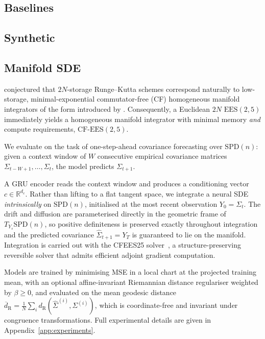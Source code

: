 \documentclass{article}
\theoremstyle{definition}
\theoremstyle{remark}
\begin{document}
\subsection{Baselines}

\subsection{Synthetic}

\subsection{Manifold SDE}
\label{subsec:experiment_manifold_sde}
\citet{bazavov_commutator-free_2020} conjectured that $2N$-storage Runge--Kutta schemes correspond naturally to low-storage, minimal-exponential commutator-free (CF) homogeneous manifold integrators of the form introduced by \citet{celledoni_commutator-free_2003}. Consequently, a Euclidean $2N$ $\mathrm{EES}(2,5)$ immediately yields a homogeneous manifold integrator with minimal memory \textit{and} compute requirements, $\mathrm{CF\text{-}EES}(2,5)$.


We evaluate on the task of one-step-ahead covariance forecasting over
$\mathrm{SPD}(n)$: given a context window of $W$ consecutive empirical covariance
matrices $\Sigma_{t-W+1}, \ldots, \Sigma_t$, the model predicts $\Sigma_{t+1}$.

A GRU encoder reads the context window and produces a conditioning vector
$c \in \mathbb{R}^{d_c}$.  Rather than lifting to a flat tangent space, we integrate
a neural SDE \emph{intrinsically} on $\mathrm{SPD}(n)$, initialised at the most recent
observation $Y_0 = \Sigma_t$.  The drift and diffusion are parameterised directly in
the geometric frame of $T_{Y_s}\mathrm{SPD}(n)$, so positive definiteness is preserved
exactly throughout integration and the predicted covariance $\hat\Sigma_{t+1} = Y_T$
is guaranteed to lie on the manifold.  Integration is carried out with the
CFEES25 solver~\cite{cfees25}, a structure-preserving reversible solver that admits
efficient adjoint gradient computation.

Models are trained by minimising MSE in a local chart at the projected training mean,
with an optional affine-invariant Riemannian distance regulariser weighted by
$\beta \geq 0$, and evaluated on the mean geodesic distance
$\overline{d}_{\mathrm{R}} = \frac{1}{N}\sum_i d_{\mathrm{R}}(\hat\Sigma^{(i)}, \Sigma^{(i)})$,
which is coordinate-free and invariant under congruence transformations.
Full experimental details are given in Appendix~\ref{app:experiments}.
\end{document}
